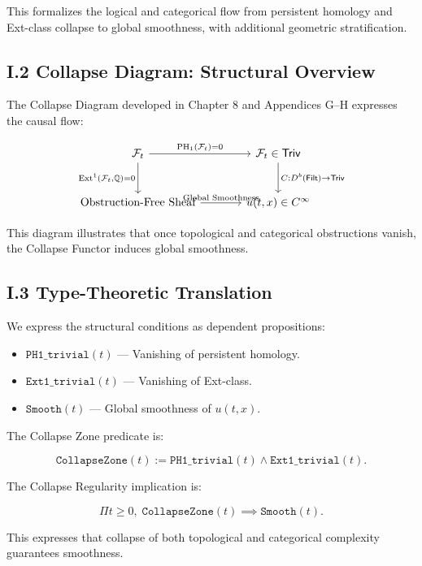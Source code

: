 \documentclass[11pt]{article}
\begin{document}
This formalizes the logical and categorical flow from persistent homology and Ext-class collapse to global smoothness, with additional geometric stratification.

\subsection*{I.2 Collapse Diagram: Structural Overview}

The Collapse Diagram developed in Chapter 8 and Appendices G–H expresses the causal flow:

\[
\begin{tikzcd}[row sep=large, column sep=large]
\mathcal{F}_t
  \arrow[r, "{\mathrm{PH}_1(\mathcal{F}_t) = 0}"]
  \arrow[d, "{\mathrm{Ext}^1(\mathcal{F}_t, \mathbb{Q}) = 0}"']
& \mathcal{F}_t \in \mathsf{Triv}
  \arrow[d, "{C : D^b(\mathsf{Filt}) \to \mathsf{Triv}}"] \\
\text{Obstruction-Free Sheaf}
  \arrow[r, "{\text{Global Smoothness}}"]
& u(t, x) \in C^\infty
\end{tikzcd}
\]

This diagram illustrates that once topological and categorical obstructions vanish, the Collapse Functor induces global smoothness.

\subsection*{I.3 Type-Theoretic Translation}

We express the structural conditions as dependent propositions:

\begin{itemize}
  \item \( \texttt{PH1\_trivial}(t) \) — Vanishing of persistent homology.
  \item \( \texttt{Ext1\_trivial}(t) \) — Vanishing of Ext-class.
  \item \( \texttt{Smooth}(t) \) — Global smoothness of \( u(t, x) \).
\end{itemize}

The Collapse Zone predicate is:

\[
\texttt{CollapseZone}(t) := \texttt{PH1\_trivial}(t) \land \texttt{Ext1\_trivial}(t).
\]

The Collapse Regularity implication is:

\[
\Pi t \geq 0,\; \texttt{CollapseZone}(t) \implies \texttt{Smooth}(t).
\]

This expresses that collapse of both topological and categorical complexity guarantees smoothness.
\end{document}

